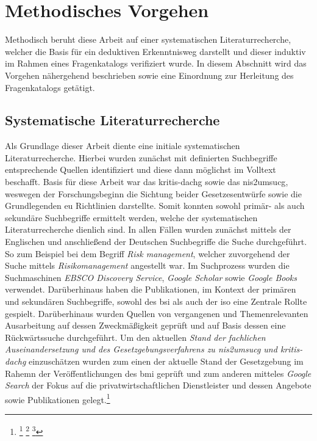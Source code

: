 \documentclass[11pt,a4paper,hidelinks]{article}   %
\begin{document}
    \section{Methodisches Vorgehen}                                                         %
        Methodisch beruht diese Arbeit auf einer systematischen Literaturrecherche, welcher die Basis für ein deduktiven Erkenntnisweg darstellt und dieser induktiv im Rahmen eines Fragenkatalogs verifiziert wurde. In diesem Abschnitt wird das Vorgehen nähergehend beschrieben sowie eine Einordnung zur Herleitung des Fragenkatalogs getätigt.
        \subsection{Systematische Literaturrecherche}
            Als Grundlage dieser Arbeit diente eine initiale systematischen Literaturrecherche. Hierbei wurden zunächst mit definierten Suchbegriffe entsprechende Quellen identifiziert und diese dann möglichst im Volltext beschafft. Basis für diese Arbeit war das \gls{kritis-dachg} sowie das \gls{nis2umsucg}, weswegen der Forschungsbeginn die Sichtung beider Gesetzesentwürfe sowie die Grundlegenden \gls{eu} Richtlinien darstellte. Somit konnten sowohl primär- als auch sekundäre Suchbegriffe ermittelt werden, welche der systematischen Literaturrecherche dienlich sind. In allen Fällen wurden zunächst mittels der Englischen und anschließend der Deutschen Suchbegriffe die Suche durchgeführt. So zum Beispiel bei dem Begriff \emph{Risk management}, welcher zuvorgehend der Suche mittels \emph{Risikomanagement} angestellt war. Im Suchprozess wurden die Suchmaschinen \emph{EBSCO Discovery Service}, \emph{Google Scholar} sowie \emph{Google Books} verwendet. Darüberhinaus haben die Publikationen, im Kontext der primären und sekundären Suchbegriffe, sowohl des \gls{bsi} als auch der \gls{iso} eine Zentrale Rollte gespielt. Darüberhinaus wurden Quellen von vergangenen und Themenrelevanten Ausarbeitung auf dessen Zweckmäßigkeit geprüft und auf Basis dessen eine Rückwärtssuche durchgeführt. Um den aktuellen \emph{Stand der fachlichen Auseinandersetzung und des Gesetzgebungsverfahrens zu \gls{nis2umsucg} und \gls{kritis-dachg}} einzuschätzen wurden zum einen der aktuelle Stand der Gesetzgebung im Rahemn der Veröffentlichungen des \gls{bmi} geprüft und zum anderen mitteles \emph{Google Search} der Fokus auf die privatwirtschaftlichen Dienstleister und dessen Angebote sowie Publikationen gelegt.\footnote{
                \footcite[Vgl.][, S. 163 - 167]{9783662647622}
                \footcite[Vgl.][, S. 215 - 216 \& 218 - 220]{10.17705-1CAIS.03709}
                \footcite[Vgl.][, S. 81 – 58 \& 298 – 299]{9783825250843}
            }
\end{document}
